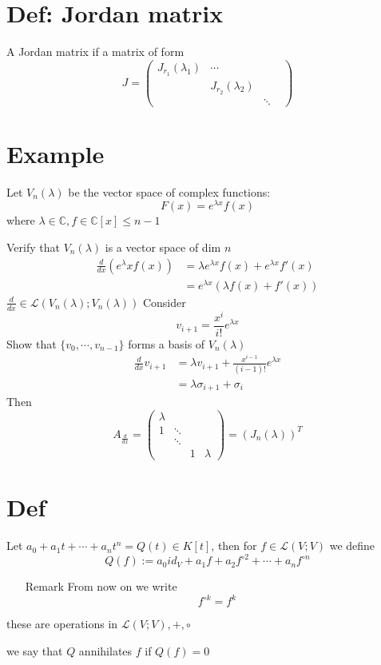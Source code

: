 \documentclass{book}
\begin{document}
\section{Def: Jordan matrix}
A Jordan matrix if a matrix of form
$$J=\begin{pmatrix}
    J_{r_1}(\lambda_1)&\cdots&\\
    &J_{r_2}(\lambda_2)&&\\
    &&\ddots&
\end{pmatrix}$$
\section{Example}
Let $V_n(\lambda)$ be the vector space of complex functions:
$$F(x)=e^{\lambda x}f(x)$$ where $\lambda\in \mathbb{C},f\in \mathbb{C}[x]\leq n-1$

Verify that $V_n(\lambda)$ is a vector space of dim $n$
$$\begin{aligned}
    \frac{d}{dx}(e^\lambda x f(x)) &=\lambda e^{\lambda x}f(x)+e^{\lambda x}f'(x)\\ &=e^{\lambda x}(\lambda f(x)+f'(x))
\end{aligned}$$
$\frac{d}{dx}\in\mathscr{L}(V_n(\lambda);V_n(\lambda))$ Consider$$v_{i+1}=\frac{x^i}{i!}e^{\lambda x}$$
Show that $\{v_0,\cdots,v_{n-1}\}$ forms a basis of $V_n(\lambda)$
$$\begin{aligned}
    \frac{d}{dx}v_{i+1} &=\lambda v_{i+1}+\frac{x^{i-1}}{(i-1)!}e^{\lambda x}\\ &=\lambda\sigma_{i+1}+\sigma_i
\end{aligned}$$
Then 
$$A_{\frac{d}{dx}}=\begin{pmatrix}
    \lambda& & &\\
    1&\ddots&&\\
    &\ddots&&\\
    &&1&\lambda
\end{pmatrix}=(J_n(\lambda))^T$$
\section{Def}
Let $a_0+a_1t+\cdots+a_nt^n= Q(t)\in K[t]$, then for $f\in \mathscr{L}(V;V)$ we define 
$$Q(f):=a_0id_V+a_1f+a_2f^{\circ 2}+\cdots+a_nf^{\circ n}$$
\begin{itemize}
    \item[Remark]
From now on we write
$$f^{\circ k}=f^k$$
\end{itemize}
these are operations in $\mathscr{L}(V;V),+,\circ$

we say that $Q$ annihilates $f$ if $Q(f)=0$
\end{document}

